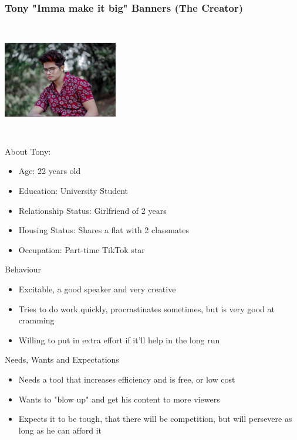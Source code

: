 \documentclass[letterpaper]{article}
\begin{document}
        \subsubsection{Tony "Imma make it big" Banners (The Creator)}
        \begin{multicols}{2}
            \includegraphics[width=5cm, height=5cm]{boy}
            \begin{large}
                About Tony:
            \end{large}
            \begin{itemize}
                \item Age: 22 years old
                \item Education: University Student
                \item Relationship Status: Girlfriend of 2 years
                \item Housing Status: Shares a flat with 2 classmates
                \item Occupation: Part-time TikTok star
            \end{itemize}
        \end{multicols}
        \begin{multicols}{2}
            \begin{large}
                Behaviour
            \end{large}
            \begin{itemize}
                \item Excitable, a good speaker and very creative
                \item Tries to do work quickly, procrastinates sometimes, but is very good at cramming
                \item Willing to put in extra effort if it'll help in the long run
            \end{itemize}
            \begin{large}
                Needs, Wants and Expectations
            \end{large}
            \begin{itemize}
                \item Needs a tool that increases efficiency and is free, or low cost
                \item Wants to "blow up" and get his content to more viewers
                \item Expects it to be tough, that there will be competition, but will persevere as long as he can afford it
            \end{itemize}
        \end{multicols}
\end{document}
